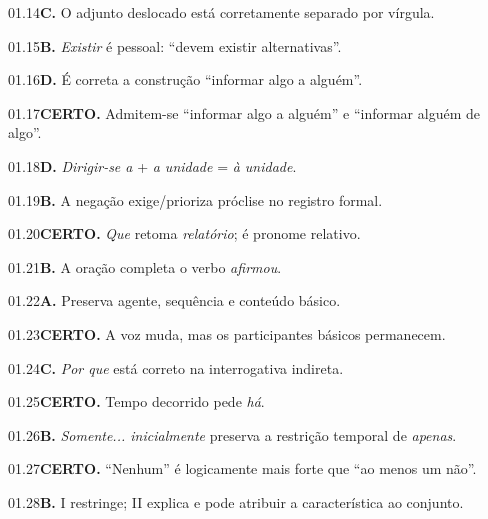 \begin{solucao}{01.14}\textbf{C.} O adjunto deslocado está corretamente separado por vírgula.\end{solucao}
\begin{solucao}{01.15}\textbf{B.} \emph{Existir} é pessoal: ``devem existir alternativas''.\end{solucao}
\begin{solucao}{01.16}\textbf{D.} É correta a construção ``informar algo a alguém''.\end{solucao}
\begin{solucao}{01.17}\textbf{CERTO.} Admitem-se ``informar algo a alguém'' e ``informar alguém de algo''.\end{solucao}
\begin{solucao}{01.18}\textbf{D.} \emph{Dirigir-se a} + \emph{a unidade} = \emph{à unidade}.\end{solucao}
\begin{solucao}{01.19}\textbf{B.} A negação exige/prioriza próclise no registro formal.\end{solucao}
\begin{solucao}{01.20}\textbf{CERTO.} \emph{Que} retoma \emph{relatório}; é pronome relativo.\end{solucao}
\begin{solucao}{01.21}\textbf{B.} A oração completa o verbo \emph{afirmou}.\end{solucao}
\begin{solucao}{01.22}\textbf{A.} Preserva agente, sequência e conteúdo básico.\end{solucao}
\begin{solucao}{01.23}\textbf{CERTO.} A voz muda, mas os participantes básicos permanecem.\end{solucao}
\begin{solucao}{01.24}\textbf{C.} \emph{Por que} está correto na interrogativa indireta.\end{solucao}
\begin{solucao}{01.25}\textbf{CERTO.} Tempo decorrido pede \emph{há}.\end{solucao}
\begin{solucao}{01.26}\textbf{B.} \emph{Somente... inicialmente} preserva a restrição temporal de \emph{apenas}.\end{solucao}
\begin{solucao}{01.27}\textbf{CERTO.} ``Nenhum'' é logicamente mais forte que ``ao menos um não''.\end{solucao}
\begin{solucao}{01.28}\textbf{B.} I restringe; II explica e pode atribuir a característica ao conjunto.\end{solucao}
